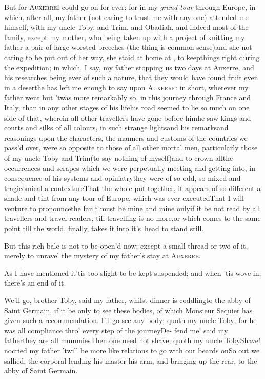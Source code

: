 \documentclass{article}
\begin{document}
But for \textsc{Auxerre}\tsk I could go on for ever: for
in my \textit{grand tour} through Europe, in which, after all,
my father (not caring to trust me with any one) attended me
himself, with my uncle Toby, and Trim, and
Obadiah, and indeed most of the family, except my mother,
who being
taken up with a project of knitting my father a pair of large worsted breeches\tsk
(the thing is common sense)\tsk and she not caring to be put out of her way, she
staid at home at , to keep\break things right during the expedition;
in which, I say, my father stopping us two days at Auxerre, and his researches being
ever of such a nature, that they would have found fruit even in a desert\tsh he has
left me enough to say upon \textsc{Auxerre}: in short, wherever my father went\tsh
but ’twas more remarkably so, in this journey through France and Italy, than in any
other stages of his life\tsk his road seemed to lie so much on one side of that,
wherein all other travellers have gone before him\tsk he saw kings and courts and
silks of all colours,
in such strange lights\tsh and his remarks\break and reasonings upon the characters, the
manners and customs of the countries we pass’d over, were so opposite to those of
all other mortal men, particularly those of my uncle Toby and Trim\tsk (to say
nothing of myself)\tsk and to crown all\tsk the occurrences and scrapes which we
were perpetually meeting and getting into, in consequence of his systems and
opiniatry\tsk they were of so odd, so mix\-ed and tragicomical a contexture\tsk That
the whole put together, it appears of so different a shade and tint from any tour of
Europe, which was ever executed\tsk That I will venture to pronounce\tsk the fault
must be mine and mine only\tsk if it be not read by all travellers and
travel-readers, till travelling is no more,\tsk or which comes to the same point\tsk
till the
world, finally, takes it into it’s\sic\ head to stand still.\tsh

\tsh But this rich bale is not to be open’d now;
except a small thread or two of it, merely to unravel the mystery
of my father’s stay at \textsc{Auxerre}.

\tsh As I have mentioned it\tsk ’tis too slight
to be kept suspended; and when ’tis wove in, there’s an end
of it.

We’ll go, brother Toby, said my father, whilst dinner is coddling\tsk to the\break
abby of Saint Germain, if it be only to see these bodies, of which Monsieur Se\-quier has
given such a recommendation.\break
\tsh I’ll go see any body; quoth my uncle Toby; for he
was all compliance thro’ every step of the journey\tsh De-
fend me! said my father\tsk they are all mummies\tsk Then one need not shave; quoth
my uncle Toby\tsk Shave!  no\tsk\break cried my father\tsk
’twill be more like rela\-tions
to go with our beards on\tsk So out we sallied, the corporal lending his master his
arm, and bringing up the rear, to the abby of Saint Germain.
\end{document}
